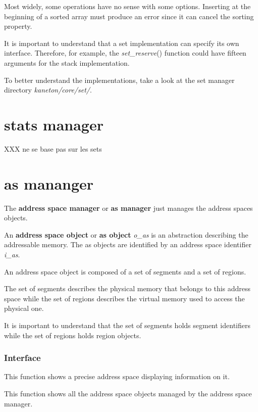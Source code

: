 Most widely, some operations have no sense with some options. Inserting
at the beginning of a sorted array must produce an error since it can
cancel the sorting property.

It is important to understand that a set implementation can specify
its own interface. Therefore, for example, the \textit{set\_reserve}()
function could have fifteen arguments for the stack implementation.

To better understand the implementations, take a look at the set
manager directory \textit{kaneton/core/set/}.

%
%

\section{stats manager}

XXX ne se base pas sur les sets

%
%

\section{as mananger}

The \textbf{address space manager} or \textbf{as manager} just manages
the address spaces objects.

An \textbf{address space object} or \textbf{as object} \textit{o\_as}
is an abstraction describing the addressable memory. The as objects
are identified by an address space identifier \textit{i\_as}.

An address space object is composed of a set of segments and a set of regions.

The set of segments describes the physical memory that belongs to this
address space while the set of regions describes the virtual memory
used to access the physical one.

It is important to understand that the set of segments holds segment
identifiers while the set of regions holds region objects.

%
%

\subsubsection{Interface}

	 {
	   This function shows a precise address space displaying
	   information on it.
	 }

	 {
	   This function shows all the address space objects managed by
	   the address space manager.
	 }


